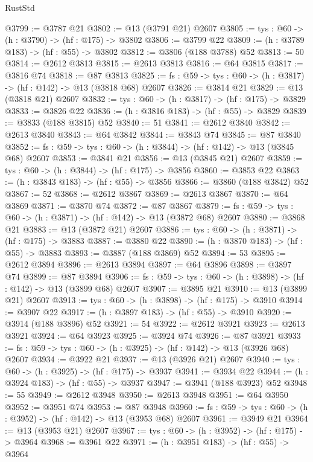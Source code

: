 \begin{lexlean}{RustStd}
\begin{coremodule}
@3799 := @3787 @21
@3802 := @13 (@3791 @21) @2607
@3805 := {tys : @60} -> (h : @3790) -> (hf : @175) -> @3802
@3806 := @3799 @22
@3809 := (h : @3789 @183) -> (hf : @55) -> @3802
@3812 := @3806 (@188 @3788) @52
@3813 := 50
@3814 := @2612 @3813
@3815 := @2613 @3813
@3816 := @64 @3815
@3817 := @3816 @74
@3818 := @87 @3813
@3825 := {fs : @59} -> {tys : @60} -> (h : @3817) -> (hf : @142) -> @13 (@3818 @68) @2607
@3826 := @3814 @21
@3829 := @13 (@3818 @21) @2607
@3832 := {tys : @60} -> (h : @3817) -> (hf : @175) -> @3829
@3833 := @3826 @22
@3836 := (h : @3816 @183) -> (hf : @55) -> @3829
@3839 := @3833 (@188 @3815) @52
@3840 := 51
@3841 := @2612 @3840
@3842 := @2613 @3840
@3843 := @64 @3842
@3844 := @3843 @74
@3845 := @87 @3840
@3852 := {fs : @59} -> {tys : @60} -> (h : @3844) -> (hf : @142) -> @13 (@3845 @68) @2607
@3853 := @3841 @21
@3856 := @13 (@3845 @21) @2607
@3859 := {tys : @60} -> (h : @3844) -> (hf : @175) -> @3856
@3860 := @3853 @22
@3863 := (h : @3843 @183) -> (hf : @55) -> @3856
@3866 := @3860 (@188 @3842) @52
@3867 := 52
@3868 := @2612 @3867
@3869 := @2613 @3867
@3870 := @64 @3869
@3871 := @3870 @74
@3872 := @87 @3867
@3879 := {fs : @59} -> {tys : @60} -> (h : @3871) -> (hf : @142) -> @13 (@3872 @68) @2607
@3880 := @3868 @21
@3883 := @13 (@3872 @21) @2607
@3886 := {tys : @60} -> (h : @3871) -> (hf : @175) -> @3883
@3887 := @3880 @22
@3890 := (h : @3870 @183) -> (hf : @55) -> @3883
@3893 := @3887 (@188 @3869) @52
@3894 := 53
@3895 := @2612 @3894
@3896 := @2613 @3894
@3897 := @64 @3896
@3898 := @3897 @74
@3899 := @87 @3894
@3906 := {fs : @59} -> {tys : @60} -> (h : @3898) -> (hf : @142) -> @13 (@3899 @68) @2607
@3907 := @3895 @21
@3910 := @13 (@3899 @21) @2607
@3913 := {tys : @60} -> (h : @3898) -> (hf : @175) -> @3910
@3914 := @3907 @22
@3917 := (h : @3897 @183) -> (hf : @55) -> @3910
@3920 := @3914 (@188 @3896) @52
@3921 := 54
@3922 := @2612 @3921
@3923 := @2613 @3921
@3924 := @64 @3923
@3925 := @3924 @74
@3926 := @87 @3921
@3933 := {fs : @59} -> {tys : @60} -> (h : @3925) -> (hf : @142) -> @13 (@3926 @68) @2607
@3934 := @3922 @21
@3937 := @13 (@3926 @21) @2607
@3940 := {tys : @60} -> (h : @3925) -> (hf : @175) -> @3937
@3941 := @3934 @22
@3944 := (h : @3924 @183) -> (hf : @55) -> @3937
@3947 := @3941 (@188 @3923) @52
@3948 := 55
@3949 := @2612 @3948
@3950 := @2613 @3948
@3951 := @64 @3950
@3952 := @3951 @74
@3953 := @87 @3948
@3960 := {fs : @59} -> {tys : @60} -> (h : @3952) -> (hf : @142) -> @13 (@3953 @68) @2607
@3961 := @3949 @21
@3964 := @13 (@3953 @21) @2607
@3967 := {tys : @60} -> (h : @3952) -> (hf : @175) -> @3964
@3968 := @3961 @22
@3971 := (h : @3951 @183) -> (hf : @55) -> @3964

\end{coremodule}
\end{lexlean}
